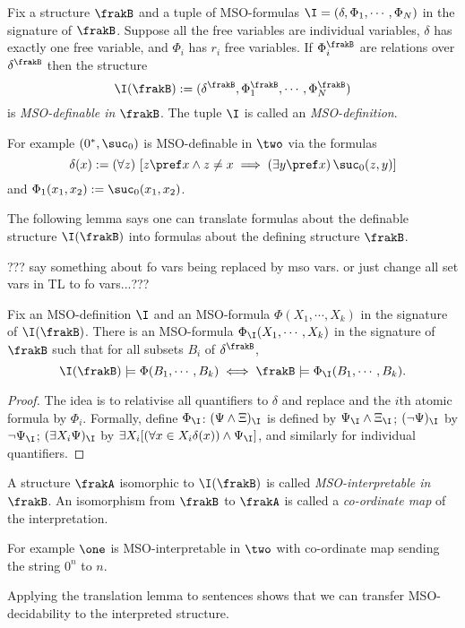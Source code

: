 Fix a structure $\frakB$ and a tuple of MSO-formulas $\I = (\delta, \Phi_1, \cdots, \Phi_N)$ in the signature of $\frakB$.
Suppose all the free variables are individual variables, $\delta$ has exactly one free variable, and $\Phi_i$ has $r_i$ free variables.
If $\Phi_i^\frakB$ are relations over $\delta^\frakB$ then the structure 
\[
\I(\frakB) := (\delta^\frakB, \Phi_1^\frakB, \cdots, \Phi_N^\frakB)
\] 
is {\em MSO-definable in $\frakB$}. The tuple $\I$ is called an {\em MSO-definition}.

For example $(0^\ast,\suc_0)$ is MSO-definable in $\two$ via the formulas
\[
\delta(x) := (\forall z)\, \left[z \pref x \wedge z \neq x \implies (\exists y \pref x)\,  \suc_0(z,y)\right]
\]
and $\Phi_1(x_1,x_2) := \suc_0(x_1,x_2)$. 


The following lemma says one can translate formulas about the definable structure $\I(\frakB)$ into formulas about the defining structure $\frakB$.

??? say something about fo vars being replaced by mso vars.
or just change all set vars in TL to fo vars...???
\begin{lemma} 
Fix an MSO-definition $\I$ and an MSO-formula $\Phi(X_1,\cdots,X_k)$ in the signature of $\I(\frakB)$.
There is an MSO-formula $\Phi_\I(X_1,\cdots,X_k)$ in the signature of $\frakB$ such that for all subsets $B_i$ of $\delta^\frakB$,
\[
\I(\frakB) \models \Phi(B_1,\cdots,B_k) \iff \frakB \models \Phi_\I(B_1,\cdots,B_k).
\]
\end{lemma}

\begin{proof}
The idea is to relativise all quantifiers to $\delta$ and replace and the $i$th atomic formula by $\Phi_i$.
Formally, define $\Phi_\I$: $(\Psi \wedge \Xi)_\I$ is defined by $\Psi_\I
\wedge \Xi_\I$; $(\neg \Psi)_\I$ by $\neg \Psi_\I$; $(\exists X_i \Psi)_\I$ by
$\exists X_i [ (\forall x \in X_i \delta(x)) \wedge \Psi_\I]$, and similarly for individual quantifiers. 
\end{proof}


A structure $\frakA$ isomorphic to $\I(\frakB)$ is called {\em
MSO-interpretable in $\frakB$}. An isomorphism from $\frakB$ to $\frakA$ is called a {\em co-ordinate map} of the interpretation. 

For example $\one$ is MSO-interpretable in $\two$ with co-ordinate map sending the string $0^n$ to $n$.

Applying the translation lemma to sentences shows that we can transfer MSO-decidability to the interpreted structure.

